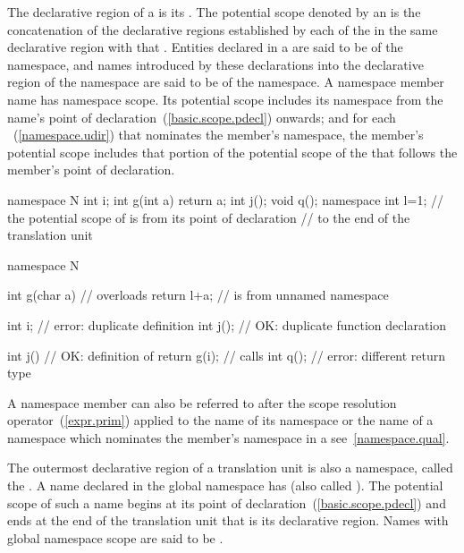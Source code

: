 \pnum
{}%
The declarative region of a  is its
. The potential scope denoted by an
 is the concatenation of the
declarative regions established by each of the
 in the same declarative region with
that . Entities declared in a
 are said to be  of the
namespace, and names introduced by these declarations into the
declarative region of the namespace are said to be  of the namespace. A namespace member name has namespace scope.
Its potential scope includes its namespace from the name's point of
declaration~(\ref{basic.scope.pdecl}) onwards; and for each
~(\ref{namespace.udir}) that nominates the
member's namespace, the member's potential scope includes that portion
of the potential scope of the  that follows
the member's point of declaration. \enterexample

\begin{codeblock}
namespace N {
	int i;
	int g(int a) { return a; }
	int j();
	void q();
}
namespace { int l=1; }
// the potential scope of  is from its point of declaration
// to the end of the translation unit

namespace N {
	int g(char a)		// overloads 
	{
		return l+a;     //  is from unnamed namespace
	}

	int i;			// error: duplicate definition
	int j();		// OK: duplicate function declaration

	int j()			// OK: definition of 
	{
		return g(i);    // calls 
	}
	int q();		// error: different return type
}
\end{codeblock}
\exitexampleb

\pnum
A namespace member can also be referred to after the \tcode{::} scope
resolution operator~(\ref{expr.prim}) applied to the name of its
namespace or the name of a namespace which nominates the member's
namespace in a  see~\ref{namespace.qual}.

\pnum
{}%
%
The outermost declarative region of a translation unit is also a
namespace, called the . A name declared in
the global namespace has  (also called
). The potential scope of such a name begins at
its point of declaration~(\ref{basic.scope.pdecl}) and ends at the end
of the translation unit that is its declarative region.
%
Names with global namespace scope are said to be
.

